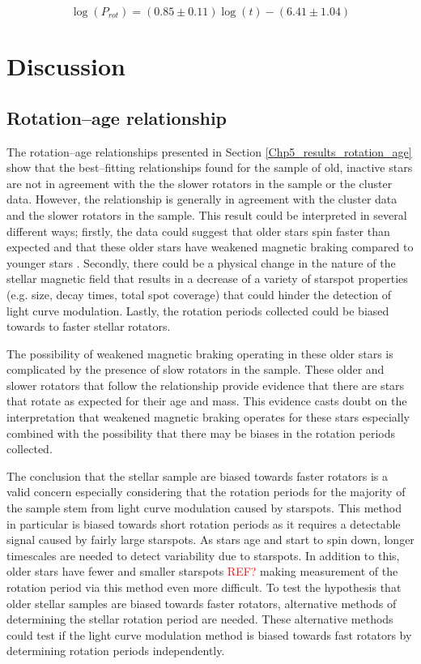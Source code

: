 \begin{equation}
    \log(P_{rot}) = (0.85 \pm 0.11)\log(t) - (6.41 \pm 1.04)
    \label{Eq:m_stars_ODR}
\end{equation}

\section{Discussion}

\subsection{Rotation--age relationship}
The rotation--age relationships presented in Section \ref{Chp5_results_rotation_age} show that the best--fitting relationships found for the sample of old, inactive stars are not in agreement with the the slower rotators in the sample or the cluster data. However, the \citet{Barnes_2007} relationship is generally in agreement with the cluster data and the slower rotators in the sample. This result could be interpreted in several different ways; firstly, the data could suggest that older stars spin faster than expected and that these older stars have weakened magnetic braking compared to younger stars \citet{van_Saders_etal_2016}. Secondly, there could be a physical change in the nature of the stellar magnetic field that results in a decrease of a variety of starspot properties (e.g. size, decay times, total spot coverage) that could hinder the detection of light curve modulation. Lastly, the rotation periods collected could be biased towards to faster stellar rotators.

The possibility of weakened magnetic braking operating in these older stars is complicated by the presence of slow rotators in the sample. These older and slower rotators that follow the \citet{Barnes_2007} relationship provide evidence that there are stars that rotate as expected for their age and mass. This evidence casts doubt on the interpretation that weakened magnetic braking operates for these stars especially combined with the possibility that there may be biases in the rotation periods collected.

The conclusion that the stellar sample are biased towards faster rotators is a valid concern especially considering that the rotation periods for the majority of the sample stem from light curve modulation caused by starspots. This method in particular is biased towards short rotation periods as it requires a detectable signal caused by fairly large starspots. As stars age and start to spin down, longer timescales are needed to detect variability due to starspots. In addition to this, older stars have fewer and smaller starspots \textcolor{red}{REF?} making measurement of the rotation period via this method even more difficult. To test the hypothesis that older stellar samples are biased towards faster rotators, alternative methods of determining the stellar rotation period are needed. These alternative methods could test if the light curve modulation method is biased towards fast rotators by determining rotation periods independently.

